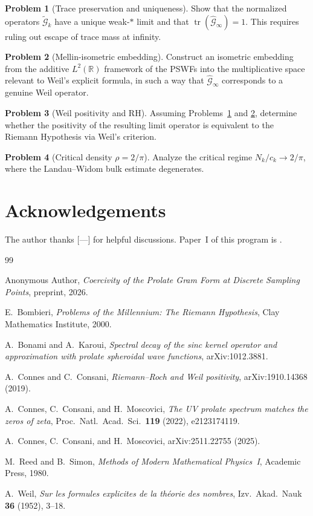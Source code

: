 \documentclass[12pt,a4paper]{amsart}
\theoremstyle{definition}
\newtheorem{problem}{Problem}[section]
\newcommand{\Gcal}{\widehat{\mathcal{G}}}
\begin{document}
\begin{problem}[Trace preservation and uniqueness]\label{prob:unique}
Show that the normalized operators $\widetilde{\mathcal G}_k$ have a unique weak-$*$ limit and that
$\operatorname{tr}(\Gcal_\infty)=1$.
This requires ruling out escape of trace mass at infinity.
\end{problem}

\begin{problem}[Mellin-isometric embedding]\label{prob:mellin}
Construct an isometric embedding from the additive $L^2(\mathbb R)$ framework of the PSWFs
into the multiplicative space relevant to Weil's explicit formula, in such a way that
$\Gcal_\infty$ corresponds to a genuine Weil operator.
\end{problem}

\begin{problem}[Weil positivity and RH]\label{prob:positivity}
Assuming Problems~\ref{prob:unique} and \ref{prob:mellin}, determine whether the positivity of the
resulting limit operator is equivalent to the Riemann Hypothesis via Weil's criterion.
\end{problem}

\begin{problem}[Critical density $\rho=2/\pi$]\label{prob:critical}
Analyze the critical regime $N_k/c_k\to2/\pi$, where the Landau--Widom bulk estimate degenerates.
\end{problem}

\section*{Acknowledgements}
The author thanks [---] for helpful discussions.
Paper~I of this program is \cite{PaperI}.

\begin{thebibliography}{99}

Anonymous Author,
\emph{Coercivity of the Prolate Gram Form at Discrete Sampling Points},
preprint, 2026.

E.~Bombieri,
\textit{Problems of the Millennium: The Riemann Hypothesis},
Clay Mathematics Institute, 2000.

A.~Bonami and A.~Karoui,
\textit{Spectral decay of the sinc kernel operator and approximation
with prolate spheroidal wave functions},
arXiv:1012.3881.

A.~Connes and C.~Consani,
\textit{Riemann--Roch and Weil positivity},
arXiv:1910.14368 (2019).

A.~Connes, C.~Consani, and H.~Moscovici,
\textit{The UV prolate spectrum matches the zeros of zeta},
Proc.\ Natl.\ Acad.\ Sci.\ \textbf{119} (2022), e2123174119.

A.~Connes, C.~Consani, and H.~Moscovici,
arXiv:2511.22755 (2025).

M.~Reed and B.~Simon,
\textit{Methods of Modern Mathematical Physics~I},
Academic Press, 1980.

A.~Weil,
\textit{Sur les formules explicites de la th\'{e}orie des nombres},
Izv.\ Akad.\ Nauk \textbf{36} (1952), 3--18.

\end{thebibliography}
\end{document}
